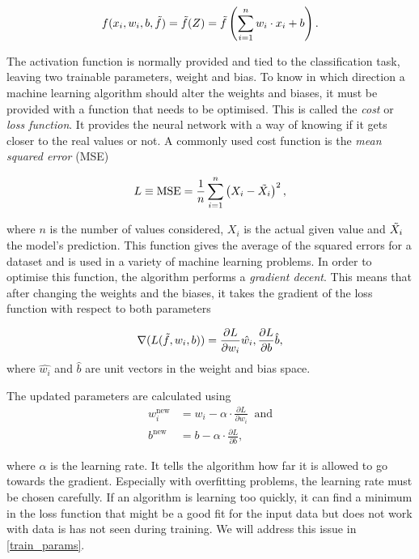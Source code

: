 \begin{equation}
    f(x_i,w_i,b,\Tilde{f}) =  \Tilde{f}(Z) = \Tilde{f} \left( \sum^n_{i=1} w_i \cdot x_i + b \right).
\end{equation}

The activation function is normally provided and tied to the classification task, leaving two trainable parameters, weight and bias.
To know in which direction a machine learning algorithm should alter the weights and biases, it must be provided with a function that needs to be optimised. This is called the \textit{cost} or \textit{loss function}. It provides the neural network with a way of knowing if it gets closer to the real values or not. A commonly used cost function is the \textit{mean squared error} (MSE)

\begin{equation}
\label{MSE}
    L \equiv \text{MSE} = \frac{1}{n}\sum^n_{i=1} \left( X_i - \Tilde{X_i} \right)^2,
\end{equation}

where $n$ is the number of values considered, $X_i$ is the actual given value and $\Tilde{X_i}$ the model's prediction. This function gives the average of the squared errors for a dataset and is used in a variety of machine learning problems. In order to optimise this function, the algorithm performs a \textit{gradient decent}. This means that after changing the weights and the biases, it takes the gradient of the loss function with respect to both parameters

\begin{equation}
    \nabla(L(\Tilde{f},w_i,b)) = \frac{\partial L}{\partial w_i}\hat{w_i}, \frac{\partial L}{\partial b}\hat{b},
\end{equation}
where $\hat{w_i}$ and $\hat{b}$ are unit vectors in the weight and bias space.

The updated parameters are calculated using
\begin{align}
    w_i^{\text{new}} &= w_i - \alpha \cdot \frac{\partial L}{\partial w_i} \; \; \text{and} \\
    b^{\text{new}} &= b - \alpha \cdot \frac{\partial L}{\partial b},
\end{align}

where $\alpha$ is the learning rate. It tells the algorithm how far it is allowed to go towards the gradient. Especially with overfitting problems, the learning rate must be chosen carefully. If an algorithm is learning too quickly, it can find a minimum in the loss function that might be a good fit for the input data but does not work with data is has not seen during training. We will address this issue in \cref{train_params}.\\

